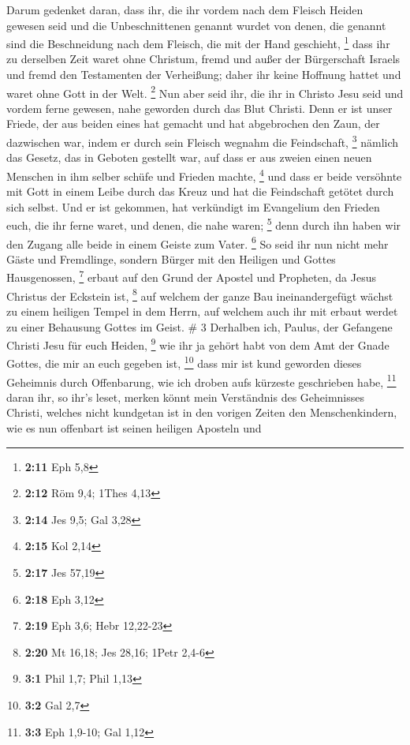  Darum gedenket daran, dass ihr, die ihr vordem nach dem
Fleisch Heiden gewesen seid und die Unbeschnittenen genannt wurdet von
denen, die genannt sind die Beschneidung nach dem Fleisch, die mit der
Hand geschieht, \footnote{\textbf{2:11} Eph 5,8}  dass ihr
zu derselben Zeit waret ohne Christum, fremd und außer der Bürgerschaft
Israels und fremd den Testamenten der Verheißung; daher ihr keine
Hoffnung hattet und waret ohne Gott in der Welt. \footnote{\textbf{2:12}
  Röm 9,4; 1Thes 4,13}  Nun aber seid ihr, die ihr in
Christo Jesu seid und vordem ferne gewesen, nahe geworden durch das Blut
Christi.  Denn er ist unser Friede, der aus beiden eines
hat gemacht und hat abgebrochen den Zaun, der dazwischen war, indem er
durch sein Fleisch wegnahm die Feindschaft, \footnote{\textbf{2:14} Jes
  9,5; Gal 3,28}  nämlich das Gesetz, das in Geboten
gestellt war, auf dass er aus zweien einen neuen Menschen in ihm selber
schüfe und Frieden machte, \footnote{\textbf{2:15} Kol 2,14}
 und dass er beide versöhnte mit Gott in einem Leibe durch
das Kreuz und hat die Feindschaft getötet durch sich selbst.
 Und er ist gekommen, hat verkündigt im Evangelium den
Frieden euch, die ihr ferne waret, und denen, die nahe waren;
\footnote{\textbf{2:17} Jes 57,19}  denn durch ihn haben
wir den Zugang alle beide in einem Geiste zum Vater. \footnote{\textbf{2:18}
  Eph 3,12}  So seid ihr nun nicht mehr Gäste und
Fremdlinge, sondern Bürger mit den Heiligen und Gottes Hausgenossen,
\footnote{\textbf{2:19} Eph 3,6; Hebr 12,22-23}  erbaut auf
den Grund der Apostel und Propheten, da Jesus Christus der Eckstein ist,
\footnote{\textbf{2:20} Mt 16,18; Jes 28,16; 1Petr 2,4-6} 
auf welchem der ganze Bau ineinandergefügt wächst zu einem heiligen
Tempel in dem Herrn,  auf welchem auch ihr mit erbaut
werdet zu einer Behausung Gottes im Geist. \# 3  Derhalben
ich, Paulus, der Gefangene Christi Jesu für euch Heiden, \footnote{\textbf{3:1}
  Phil 1,7; Phil 1,13}  wie ihr ja gehört habt von dem Amt
der Gnade Gottes, die mir an euch gegeben ist, \footnote{\textbf{3:2}
  Gal 2,7}  dass mir ist kund geworden dieses Geheimnis
durch Offenbarung, wie ich droben aufs kürzeste geschrieben habe,
\footnote{\textbf{3:3} Eph 1,9-10; Gal 1,12}  daran ihr, so
ihr's leset, merken könnt mein Verständnis des Geheimnisses Christi,
 welches nicht kundgetan ist in den vorigen Zeiten den
Menschenkindern, wie es nun offenbart ist seinen heiligen Aposteln und
